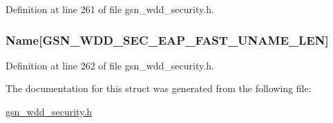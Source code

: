 Definition at line 261 of file gsn\_\-wdd\_\-security.h.

\hypertarget{a00290_afca8d8cf402048dcd824e474cea9dffa}{
\subsubsection[{Name}]{ {\bf Name}\mbox{[}GSN\_\-WDD\_\-SEC\_\-EAP\_\-FAST\_\-UNAME\_\-LEN\mbox{]}}}
\label{a00290_afca8d8cf402048dcd824e474cea9dffa}


Definition at line 262 of file gsn\_\-wdd\_\-security.h.



The documentation for this struct was generated from the following file:\begin{DoxyCompactItemize}
\item 
\hyperlink{a00604}{gsn\_\-wdd\_\-security.h}\end{DoxyCompactItemize}
